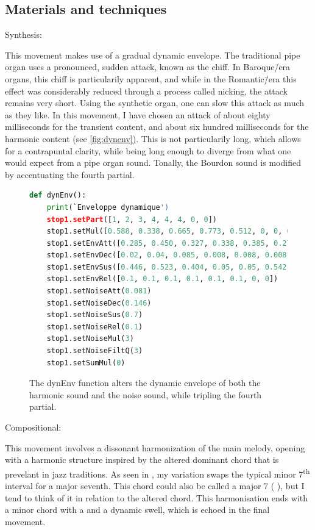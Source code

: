 \documentclass[12pt,twoside,maitrise]{dms_ks}
\theoremstyle{definition}
\begin{document}
{\subsection{Materials and techniques}

Synthesis:

This movement makes use of a gradual dynamic envelope.
The traditional pipe organ uses a pronounced, sudden attack, known as the chiff.
In Baroque\=/era organs, this chiff is particularily apparent, and while in the Romantic\=/era this effect was considerably reduced through a process called nicking, the attack remains very short.
Using the synthetic organ, one can slow this attack as much as they like. 
In this movement, I have chosen an attack of about eighty milliseconds for the transient content, and about six hundred milliseconds for the harmonic content (see \cref{fig:dynenv}). This is not particularily long, which allows for a contrapuntal clarity, while being long enough to diverge from what one would expect from a pipe organ sound.
Tonally, the Bourdon sound is modified by accentuating the fourth partial.

\begin{figure}[H]
\begin{lstlisting}[language=Python]
def dynEnv():
    print(`Enveloppe dynamique')
    stop1.setPart([1, 2, 3, 4, 4, 4, 0, 0])
    stop1.setMul([0.588, 0.338, 0.665, 0.773, 0.512, 0, 0, 0])
    stop1.setEnvAtt([0.285, 0.450, 0.327, 0.338, 0.385, 0.277, 0, 0])
    stop1.setEnvDec([0.02, 0.04, 0.085, 0.008, 0.008, 0.008, 0, 0])
    stop1.setEnvSus([0.446, 0.523, 0.404, 0.05, 0.05, 0.542, 0, 0])
    stop1.setEnvRel([0.1, 0.1, 0.1, 0.1, 0.1, 0.1, 0, 0])
    stop1.setNoiseAtt(0.081)
    stop1.setNoiseDec(0.146)
    stop1.setNoiseSus(0.7)
    stop1.setNoiseRel(0.1)
    stop1.setNoiseMul(3)
    stop1.setNoiseFiltQ(3)
    stop1.setSumMul(0)
\end{lstlisting}
\caption{The dynEnv function alters the dynamic envelope of both the harmonic sound and the noise sound, while tripling the fourth partial.}
\label{fig:dynEnv}
\end{figure}

Compositional:

This movement involves a dissonant harmonization of the main melody, opening with a harmonic structure inspired by the altered dominant chord that is prevelant in jazz traditions.
As seen in , my variation swaps the typical minor 7\textsuperscript{th} interval for a major seventh.
This chord could also be called a major 7 ( ), but I tend to think of it in relation to the altered chord.
This harmonisation ends with a minor chord with a  and a dynamic swell, which is echoed in the final movement.

}
\end{document}
